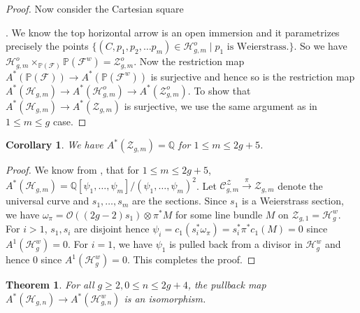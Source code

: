 \documentclass[11pt]{amsart}
\newtheorem{theorem}{Theorem}[section]
\newtheorem{corollary}{Corollary}[theorem]
\theoremstyle{definition}
\newcommand{\ri}{\rightarrow}
\newcommand{\h}{\mathcal{H}}
\begin{document}
\begin{proof}
Now consider the Cartesian square . We know the top horizontal arrow is an open immersion and it parametrizes precisely the points $\{ (C,p_1,p_2,\dots p_m) \in \mathcal H^o_{g,m}\mid p_1\text { is Weierstrass.}\}$. So we have $  \mathcal H^o_{g,m}\times_{\mathbb P(\mathcal F)} \mathbb P(\mathcal F^w) =\mathcal Z^o_{g,m}$. Now the restriction map $A^* (\mathbb P(\mathcal F)) \rightarrow A^* (\mathbb P(\mathcal F^w))$ is surjective and hence so is the restriction map $A^* (\mathcal H_{g,m})\rightarrow A^*(\mathcal H^o_{g,m}) \rightarrow A^* (\mathcal Z^o_{g,m})$. To show that $A^* (\mathcal H_{g,m})\rightarrow A^* (\mathcal Z_{g,m})$ is surjective, we use the same argument as in $1\leq m \leq g$ case. 


\end{proof}
\begin{corollary}\label{chow of Z}
    We have $A^*(\mathcal Z_{g,m})=\mathbb Q$ for $1\leq m\leq 2g+5$. 
\end{corollary}
\begin{proof}
    We know from \cite{cl-hyp}, that for $1\leq m\leq 2g+5$, $A^* (\mathcal H_{g,m}) =\mathbb Q[\psi_1,\dots, \psi_m]/ (\psi_1,\dots,\psi_m)^2$. Let $\mathcal C^{\mathcal Z}_{g,m} \xrightarrow{\pi} \mathcal Z_{g,m}$ denote the universal curve and $s_1,\dots, s_m$ are the sections. Since $s_1$ is a Weierstrass section, we have $\omega_\pi= \mathcal O((2g-2)s_1) \otimes \pi^* M$ for some line bundle $M$ on $\mathcal Z_{g,1} = \mathcal H^w_{g}$. For $i>1$, $s_1, s_i$ are disjoint hence $\psi_i =c_1(s_i^*\omega_\pi)=s_i^*\pi^* c_1( M) =0$ since $A^1(\mathcal H^w_g)=0.$ For $i=1$, we have $\psi_1 $ is pulled back from a divisor in $\mathcal H^w_g$ and hence $0$ since $A^1(\mathcal H^w_g)=0$. This completes the proof. 
\end{proof}
\begin{theorem}\label{thm:weier-pull}
    For all $g\geq 2, 0\leq n\leq 2g+4$, the pullback map $A^*(\h_{g,n})\ri A^*(\h_{g,n}^w)$ is an isomorphism.
\end{theorem}
\end{document}
